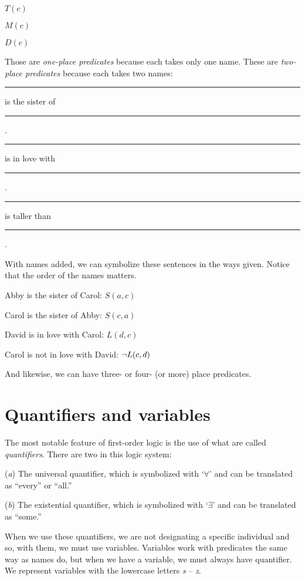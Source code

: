 \begin{ebullet}
	\item[] $T(c)$
	\item[] $M(c)$
	\item[] $D(c)$
\end{ebullet}

Those are \textit{one-place predicates} because each takes only one name. These are \textit{two-place predicates} because each takes two names:

\begin{ebullet}
	\item[] \rule{1cm}{0.15mm} is the sister of \rule{1cm}{0.15mm} .
	\item[] \rule{1cm}{0.15mm} is in love with \rule{1cm}{0.15mm} .
	\item[] \rule{1cm}{0.15mm} is taller than \rule{1cm}{0.15mm} .
\end{ebullet}
With names added, we can symbolize these sentences in the ways given. Notice that the order of the names matters.

\begin{ebullet}
	\item[] Abby is the sister of Carol: $S(a,c)$
	\item[] Carol is the sister of Abby: $S(c,a)$
	\item[] David is in love with Carol: $L(d,c)$
	\item[] Carol is not in love with David: ${\neg} L(c,d)$
\end{ebullet}
And likewise, we can have three- or four- (or more) place predicates. 


\section{Quantifiers and variables}

The most notable feature of first-order logic is the use of what are called \textit{quantifiers}. There are two in this logic system:

\begin{ebullet}
	\item[(\textit{a})] The universal quantifier, which is symbolized with `$\forall$' and can be translated as ``every'' or ``all.''
	\item[(\textit{b})] The existential quantifier, which is symbolized with `$\exists$' and can be translated as ``some.''
\end{ebullet}

When we use these quantifiers, we are not designating a specific individual and so, with them, we must use variables. Variables work with predicates the same way as names do, but when we have a variable, we must always have quantifier. We represent variables with the lowercase letters \textit{s} -- \textit{z}.

